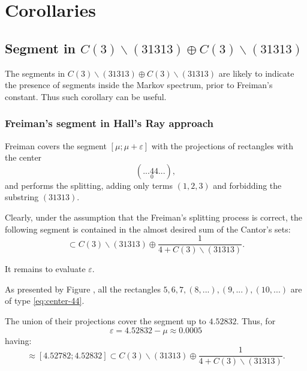 \section{Corollaries}

\subsection{Segment in $C(3) \backslash (31313) \oplus C(3) \backslash (31313)$}

The segments in $C(3) \backslash (31313) \oplus C(3) \backslash (31313)$
are likely to indicate the presence of segments inside the Markov spectrum, prior to Freiman's constant.
Thus such corollary can be useful.

\subsubsection{Freiman's segment in Hall's Ray approach}

Freiman covers the segment $[\mu; \mu + \varepsilon]$
with the projections of rectangles with the center
\begin{equation}
	\label{eq:center-44}
	(... \underset{0}{4} 4 ...),
\end{equation}
and performs the splitting, adding only terms $(1, 2, 3)$
and forbidding the substring $(31313)$.

Clearly, under the assumption that the Freiman's splitting process is correct,
the following segment is contained in the almost desired sum of the Cantor's sets:
\begin{equation*}
	[\mu - 4; \mu - 4 + \varepsilon] \subset C(3) \backslash (31313) \oplus \dfrac{1}{4 + C(3) \backslash (31313)}.
\end{equation*}

It remains to evaluate $\varepsilon$.

As presented by Figure ,
all the rectangles $5, 6, 7, (8, ...), (9, ...), (10, ...)$ are of type \ref{eq:center-44}.

The union of their projections cover the segment up to $4.52832$.
Thus, for
\begin{equation*}
	\varepsilon = 4.52832 - \mu \approx 0.0005
\end{equation*}
having:
\begin{equation}
	[\mu - 4; \mu - 4 + \varepsilon] \approx [4.52782; 4.52832] \subset
	C(3) \backslash (31313) \oplus \dfrac{1}{4 + C(3) \backslash (31313)}.
\end{equation}

